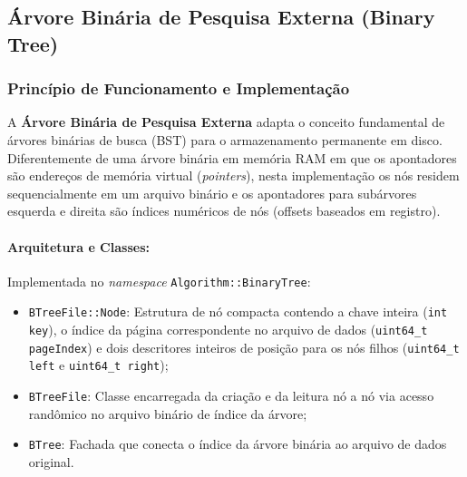 \documentclass[12pt,a4paper]{article}
\begin{document}
\subsection{Árvore Binária de Pesquisa Externa (Binary Tree)}
\label{subsec:binary_tree}

\subsubsection{Princípio de Funcionamento e Implementação}
A \textbf{Árvore Binária de Pesquisa Externa} adapta o conceito fundamental de árvores binárias de busca (BST) para o armazenamento permanente em disco. Diferentemente de uma árvore binária em memória RAM em que os apontadores são endereços de memória virtual (\textit{pointers}), nesta implementação os nós residem sequencialmente em um arquivo binário e os apontadores para subárvores esquerda e direita são índices numéricos de nós (offsets baseados em registro).

\paragraph{Arquitetura e Classes:}
Implementada no \textit{namespace} \texttt{Algorithm::BinaryTree}:
\begin{itemize}
    \item \texttt{BTreeFile::Node}: Estrutura de nó compacta contendo a chave inteira (\texttt{int key}), o índice da página correspondente no arquivo de dados (\texttt{uint64\_t pageIndex}) e dois descritores inteiros de posição para os nós filhos (\texttt{uint64\_t left} e \texttt{uint64\_t right});
    \item \texttt{BTreeFile}: Classe encarregada da criação e da leitura nó a nó via acesso randômico no arquivo binário de índice da árvore;
    \item \texttt{BTree}: Fachada que conecta o índice da árvore binária ao arquivo de dados original.
\end{itemize}
\end{document}
